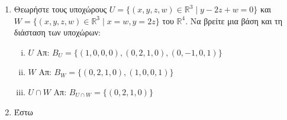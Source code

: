 \begin{enumerate}
  \item Θεωρήστε τους υποχώρους 
    $ U = \{ (x,y,z,w) \in \mathbb{R}^{3} \mid y - 2z + w = 0 \} $ και 
    $ W = \{ (x,y,z,w) \in \mathbb{R}^{3} \mid x = w, y = 2z \} $ του 
    $\mathbb{R}^{4}$. Να βρείτε μια βάση και τη διάσταση των υποχώρων:
    \begin{enumerate}[(i)]
      \item $ U $ \hfill Απ: $ B_{U} = \{ (1,0,0,0), (0,2,1,0), (0,-1,0,1) \} $ 
      \item $ W $ \hfill Απ: $ B_{W} = \{ (0,2,1,0), (1,0,0,1) \} $ 
      \item $ U \cap W $ \hfill Απ: $ B_{U\cap W} = \{ (0,2,1,0) \} $ 
    \end{enumerate}	


  \item Έστω 


\end{enumerate}
